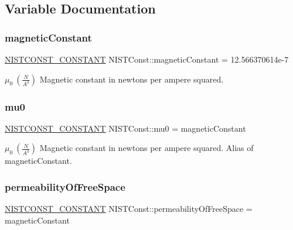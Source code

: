\subsection{Variable Documentation}
\mbox{\label{group___n_i_s_t_const-_magnetic_constant_gae78bada05f4e3438f6197ca595d9d09b}} 
\subsubsection{\texorpdfstring{magnetic\+Constant}{magneticConstant}}
{\footnotesize\ttfamily \mbox{\hyperlink{group___n_i_s_t_const-_macros_ga2b0fc1d7452373f816175dd86ce26729}{N\+I\+S\+T\+C\+O\+N\+S\+T\+\_\+\+C\+O\+N\+S\+T\+A\+NT}} N\+I\+S\+T\+Const\+::magnetic\+Constant = 12.\+566370614e-\/7}

$\mu_0 \ (\frac{N}{A^3})$ Magnetic constant in newtons per ampere squared. \mbox{\label{group___n_i_s_t_const-_magnetic_constant_gac57c9dd11cfdf9721e21096a00d6e5d8}} 
\subsubsection{\texorpdfstring{mu0}{mu0}}
{\footnotesize\ttfamily \mbox{\hyperlink{group___n_i_s_t_const-_macros_ga2b0fc1d7452373f816175dd86ce26729}{N\+I\+S\+T\+C\+O\+N\+S\+T\+\_\+\+C\+O\+N\+S\+T\+A\+NT}} N\+I\+S\+T\+Const\+::mu0 = magnetic\+Constant}

$\mu_0 \ (\frac{N}{A^3})$ Magnetic constant in newtons per ampere squared. Alias of magnetic\+Constant. \mbox{\label{group___n_i_s_t_const-_magnetic_constant_ga4ce4f543f7f71f5df049935291a3e59b}} 
\subsubsection{\texorpdfstring{permeability\+Of\+Free\+Space}{permeabilityOfFreeSpace}}
{\footnotesize\ttfamily \mbox{\hyperlink{group___n_i_s_t_const-_macros_ga2b0fc1d7452373f816175dd86ce26729}{N\+I\+S\+T\+C\+O\+N\+S\+T\+\_\+\+C\+O\+N\+S\+T\+A\+NT}} N\+I\+S\+T\+Const\+::permeability\+Of\+Free\+Space = magnetic\+Constant}

